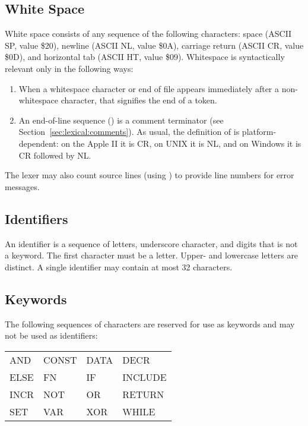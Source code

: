 \documentclass[10pt]{article}
\begin{document}
\subsection{White Space}
\label{sec:lexical:white-space}

White space consists of any sequence of the following characters:
space (ASCII SP, value \$20), newline (ASCII NL, value \$0A), carriage
return (ASCII CR, value \$0D), and horizontal tab (ASCII HT, value
\$09).  Whitespace is syntactically relevant only in the following
ways:
%
\begin{enumerate}
%
\item {} When a whitespace character or end of
file appears immediately after a non-whitespace character, that
signifies the end of a token.
%
\item {} An end-of-line sequence () is a
  comment terminator (see Section~\ref{sec:lexical:comments}).  As
  usual, the definition of  is platform-dependent: on the
  Apple II it is CR, on UNIX it is NL, and on Windows it is CR
  followed by NL.
%
\end{enumerate}
%
The lexer may also count source lines (using ) to provide
line numbers for error messages.

\subsection{Identifiers}\label{Identifiers}

An identifier is a sequence of letters, underscore character, and
digits that is not a keyword.  The first character must be a letter.
Upper- and lowercase letters are distinct.  A single identifier may
contain at most 32 characters.

\subsection{Keywords}

The following sequences of characters are reserved for use as keywords
and may not be used as identifiers:

\begin{ttfamily}
\begin{center}
\begin{tabular}{l l l l}
AND & CONST & DATA & DECR \\
%
ELSE & FN & IF & INCLUDE \\
%
INCR & NOT & OR & RETURN \\
%
SET & VAR & XOR & WHILE \\
\end{tabular}
\end{center}
\end{ttfamily}
\end{document}
